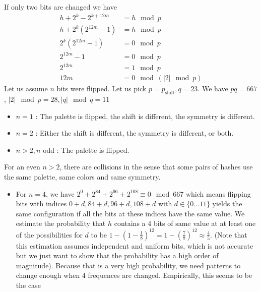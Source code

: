 \documentclass{article}
\begin{document}
If only two bits are changed we have
\begin{align*}
	h + 2^k - 2^{k+12m} &= h \mod p\\
	h + 2^k(2^{12m} - 1) &= h \mod p \\
	2^k (2^{12m} - 1) &= 0 \mod p \\
	2^{12m} - 1 &= 0 \mod p \\
	2^{12m} &= 1 \mod p \\
	12m &= 0 \mod (|2| \mod p)
\end{align*}
Let us assume $n$ bits were flipped. Let us pick $p=p_{\text{shift}}, q=23$. We have $pq = 667$, $|2| \mod p = 28, |q| \mod q = 11$
\begin{itemize}
	\item $n=1$ : The palette is flipped, the shift is different, the symmetry is different.
	\item $n=2$ : Either the shift is different, the symmetry is different, or both.
	\item $n > 2, n$ odd : The palette is flipped.
\end{itemize}
For an even $n > 2$, there are collisions in the sense that some pairs of hashes use the same palette, same colors and same symmetry.
\begin{itemize}
	\item For $n = 4$, we have $2^0 + 2^{84} + 2^{96} + 2^{108} \equiv 0 \mod 667$ which means flipping bits with indices $0 + d, 84 + d, 96 + d, 108 + d$ with $d \in \{0 \dots 11\}$ yields the same configuration if all the bits at these indices have the same value. We estimate the probability that $h$ contains a 4 bits of same value at at least one of the possibilities for $d$ to be $1 - \left(1 - \frac{1}{8}\right)^{12} = 1 - \left(\frac{7}{8}\right)^{12} \approx \frac{4}{5}$. (Note that this estimation assumes independent and uniform bits, which is not accurate but we just want to show that the probability has a high order of magnitude). Because that is a very high probability, we need patterns to change enough when 4 frequences are changed. Empirically, this seems to be the case
\end{itemize}
\end{document}
